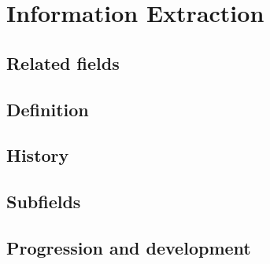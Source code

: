 \section{Information Extraction}

\subsection{Related fields}

\subsection{Definition}

\subsection{History}

\subsection{Subfields}

\subsection{Progression and development}
